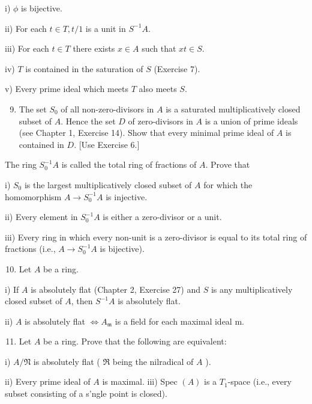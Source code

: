 \documentclass{standalone}
\theoremstyle{definition}
\theoremstyle{remark}
\begin{document}
i) $\phi$ is bijective.

ii) For each $t \in T, t / 1$ is a unit in $S^{-1} A$.

iii) For each $t \in T$ there exists $x \in A$ such that $x t \in S$.

iv) $T$ is contained in the saturation of $S$ (Exercise 7).

v) Every prime ideal which meets $T$ also meets $S$.

\begin{enumerate}
  \setcounter{enumi}{8}
  \item The set $S_{0}$ of all non-zero-divisors in $A$ is a saturated multiplicatively closed subset of $A$. Hence the set $D$ of zero-divisors in $A$ is a union of prime ideals (see Chapter 1, Exercise 14). Show that every minimal prime ideal of $A$ is contained in $D$. [Use Exercise 6.]
\end{enumerate}

The ring $S_{0}^{-1} A$ is called the total ring of fractions of $A$. Prove that

i) $S_{0}$ is the largest multiplicatively closed subset of $A$ for which the homomorphism $A \rightarrow S_{0}^{-1} A$ is injective.

ii) Every element in $S_{0}^{-1} A$ is either a zero-divisor or a unit.

iii) Every ring in which every non-unit is a zero-divisor is equal to its total ring of fractions (i.e., $A \rightarrow S_{0}^{-1} A$ is bijective).

\begin{enumerate}
  \setcounter{enumi}{9}
  \item Let $A$ be a ring.
\end{enumerate}

i) If $A$ is absolutely flat (Chapter 2, Exercise 27) and $S$ is any multiplicatively closed subset of $A$, then $S^{-1} A$ is absolutely flat.

ii) $A$ is absolutely flat $\Leftrightarrow A_{\mathfrak{m}}$ is a field for each maximal ideal $\mathrm{m}$.

\begin{enumerate}
  \setcounter{enumi}{10}
  \item Let $A$ be a ring. Prove that the following are equivalent:
\end{enumerate}

i) $A / \mathfrak{N}$ is absolutely flat ( $\mathfrak{R}$ being the nilradical of $A$ ).

ii) Every prime ideal of $A$ is maximal. iii) Spec $(A)$ is a $T_{1}$-space (i.e., every subset consisting of a s'ngle point is closed).
\end{document}
